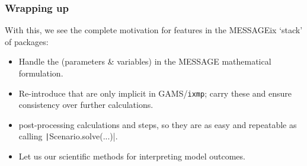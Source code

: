 \documentclass[12pt,aspectratio=169]{beamer}
\begin{document}
\begin{frame}
\frametitle{Wrapping up}

With this, we see the complete motivation for  features in the MESSAGEix ‘stack’ of packages:

\begin{itemize}
  \item Handle the  (parameters \& variables) in the MESSAGE mathematical formulation.
  \item Re-introduce  that are only implicit in GAMS/\texttt{ixmp}; carry these and ensure consistency over further calculations.
  \item {} post-processing calculations and steps, so they are as easy and repeatable as calling \texttt|Scenario.solve(...)|.
  \item Let us  our scientific methods for interpreting model outcomes.
\end{itemize}

\end{frame}
\end{document}
